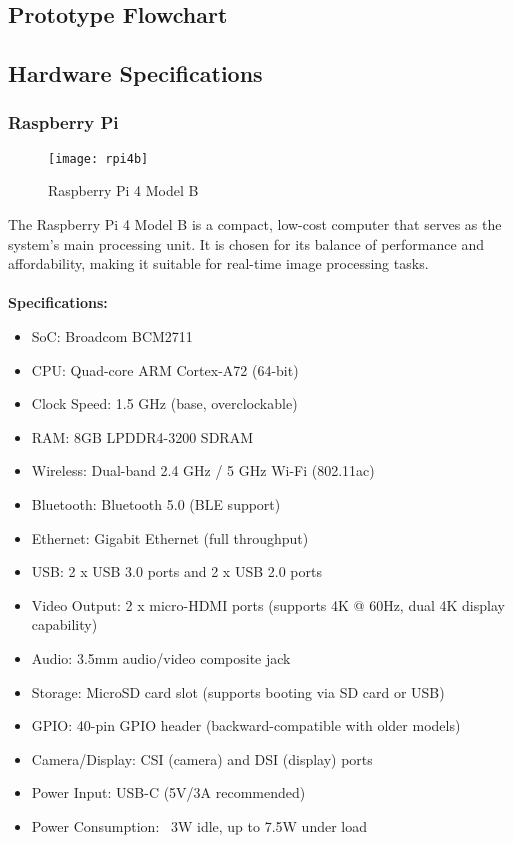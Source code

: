 \subsection{Prototype Flowchart}

\subsection{Hardware Specifications}

\subsubsection{Raspberry Pi}
\begin{figure}[!htbp]
	\centering
	\texttt{[image: rpi4b]}
	\caption{Raspberry Pi 4 Model B}
	\label{fig:rpi4b_fig}
\end{figure}
The Raspberry Pi 4 Model B is a compact, low-cost computer that serves as the system's main processing unit. 
It is chosen for its balance of performance and affordability, making it suitable for real-time image processing tasks.
\\
\\
\textbf{Specifications:}
\begin{itemize}
    \item SoC: Broadcom BCM2711
    \item CPU: Quad-core ARM Cortex-A72 (64-bit)
    \item Clock Speed: 1.5 GHz (base, overclockable)
    \item RAM: 8GB LPDDR4-3200 SDRAM
    \item Wireless: Dual-band 2.4 GHz / 5 GHz Wi-Fi (802.11ac)
    \item Bluetooth: Bluetooth 5.0 (BLE support)
    \item Ethernet: Gigabit Ethernet (full throughput)
    \item USB: 2 x USB 3.0 ports and 2 x USB 2.0 ports
    \item Video Output: 2 x micro-HDMI ports (supports 4K @ 60Hz, dual 4K display capability)
    \item Audio: 3.5mm audio/video composite jack
    \item Storage: MicroSD card slot (supports booting via SD card or USB)
    \item GPIO: 40-pin GPIO header (backward-compatible with older models)
    \item Camera/Display: CSI (camera) and DSI (display) ports
    \item Power Input: USB-C (5V/3A recommended)
    \item Power Consumption: ~3W idle, up to 7.5W under load
\end{itemize}

